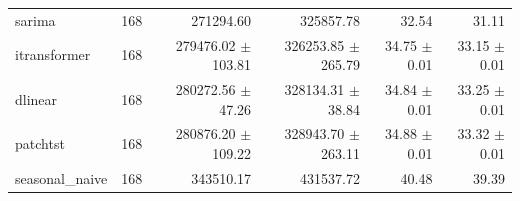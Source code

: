 \begin{table}[t]
{\begin{tabular}{llrrrr}
sarima & 168 & 271294.60 & 325857.78 & 32.54 & 31.11 \\
itransformer & 168 & 279476.02 $\pm$ 103.81 & 326253.85 $\pm$ 265.79 & 34.75 $\pm$ 0.01 & 33.15 $\pm$ 0.01 \\
dlinear & 168 & 280272.56 $\pm$ 47.26 & 328134.31 $\pm$ 38.84 & 34.84 $\pm$ 0.01 & 33.25 $\pm$ 0.01 \\
patchtst & 168 & 280876.20 $\pm$ 109.22 & 328943.70 $\pm$ 263.11 & 34.88 $\pm$ 0.01 & 33.32 $\pm$ 0.01 \\
seasonal\_naive & 168 & 343510.17 & 431537.72 & 40.48 & 39.39 \\
\bottomrule
\end{tabular}%
}
\end{table}
